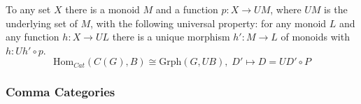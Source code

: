 \begin{corollary}
To any set $X$ there is a monoid $M$ and a function $p: X \rightarrow UM$, where $UM$ is the underlying set of $M$, with the following universal property: for any monoid $L$ and any
function $h: X \rightarrow UL$ there is a unique morphism $h': M \rightarrow L$ of monoids with $h: Uh' \circ p$.
$$\textrm{Hom}_{Cat}(C(G),B) \cong \textrm{Grph}(G,UB), \; D' \mapsto D = UD' \circ P$$
\end{corollary}

\subsubsection{Comma Categories}\label{commacategories}
